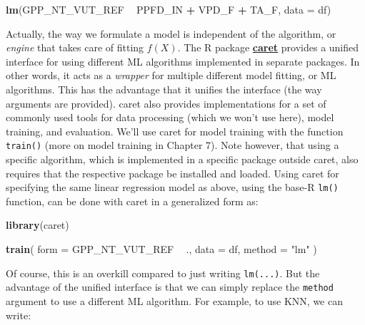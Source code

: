 \documentclass[
]{book}
\newenvironment{Shaded}{\begin{snugshade}}{\end{snugshade}}
\newcommand{\DataTypeTok}[1]{\textcolor[rgb]{0.13,0.29,0.53}{#1}}
\newcommand{\KeywordTok}[1]{\textcolor[rgb]{0.13,0.29,0.53}{\textbf{#1}}}
\newcommand{\NormalTok}[1]{#1}
\newcommand{\OperatorTok}[1]{\textcolor[rgb]{0.81,0.36,0.00}{\textbf{#1}}}
\newcommand{\StringTok}[1]{\textcolor[rgb]{0.31,0.60,0.02}{#1}}
\begin{document}
\begin{Shaded}
\begin{Highlighting}[]
\KeywordTok{lm}\NormalTok{(GPP_NT_VUT_REF }\OperatorTok{~}\StringTok{ }\NormalTok{PPFD_IN }\OperatorTok{+}\StringTok{ }\NormalTok{VPD_F }\OperatorTok{+}\StringTok{ }\NormalTok{TA_F, }\DataTypeTok{data =}\NormalTok{ df)}
\end{Highlighting}
\end{Shaded}

Actually, the way we formulate a model is independent of the algorithm, or \emph{engine} that takes care of fitting \(f(X)\). The R package \href{https://topepo.github.io/caret/}{\textbf{caret}} provides a unified interface for using different ML algorithms implemented in separate packages. In other words, it acts as a \emph{wrapper} for multiple different model fitting, or ML algorithms. This has the advantage that it unifies the interface (the way arguments are provided). caret also provides implementations for a set of commonly used tools for data processing (which we won't use here), model training, and evaluation. We'll use caret for model training with the function \texttt{train()} (more on model training in Chapter 7). Note however, that using a specific algorithm, which is implemented in a specific package outside caret, also requires that the respective package be installed and loaded. Using caret for specifying the same linear regression model as above, using the base-R \texttt{lm()} function, can be done with caret in a generalized form as:

\begin{Shaded}
\begin{Highlighting}[]
\KeywordTok{library}\NormalTok{(caret)}
\end{Highlighting}
\end{Shaded}

\begin{Shaded}
\begin{Highlighting}[]
\KeywordTok{train}\NormalTok{(}
  \DataTypeTok{form =}\NormalTok{ GPP_NT_VUT_REF }\OperatorTok{~}\StringTok{ }\NormalTok{., }
  \DataTypeTok{data =}\NormalTok{ df, }
  \DataTypeTok{method =} \StringTok{"lm"}
\NormalTok{)}
\end{Highlighting}
\end{Shaded}

Of course, this is an overkill compared to just writing \texttt{lm(...)}. But the advantage of the unified interface is that we can simply replace the \texttt{method} argument to use a different ML algorithm. For example, to use KNN, we can write:
\end{document}
